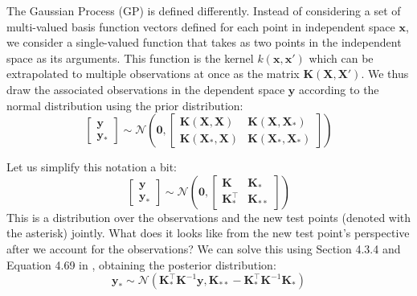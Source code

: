 \documentclass{article}
\begin{document}
The Gaussian Process (GP) is defined differently. Instead of considering a set of multi-valued basis function vectors defined for each point in independent space $\mathbf{x}$, we consider a single-valued function that takes as two points in the independent space as its arguments. This function is the kernel $k(\mathbf{x},\mathbf{x}')$ which can be extrapolated to multiple observations at once as the matrix $\mathbf{K}(\mathbf{X},\mathbf{X}')$. We thus draw the associated observations in the dependent space $\mathbf{y}$ according to the normal distribution using the prior distribution:
\begin{equation}
    \begin{bmatrix}
    \mathbf{y} \\
    \mathbf{y_\ast}
    \end{bmatrix} \sim
    \mathcal{N}\left(\mathbf{0},
    \begin{bmatrix}
    \mathbf{K}(\mathbf{X},\mathbf{X}) & \mathbf{K}(\mathbf{X},\mathbf{X}_\ast) \\
    \mathbf{K}(\mathbf{X}_\ast,\mathbf{X}) & \mathbf{K}(\mathbf{X}_\ast,\mathbf{X}_\ast)
    \end{bmatrix}\right)
\end{equation} 

Let us simplify this notation a bit:
\begin{equation}
    \begin{bmatrix}
    \mathbf{y} \\
    \mathbf{y_\ast}
    \end{bmatrix} \sim
    \mathcal{N}\left(\mathbf{0},
    \begin{bmatrix}
    \mathbf{K} & \mathbf{K}_\ast \\
    \mathbf{K}^\top_\ast & \mathbf{K}_{\ast\ast}
    \end{bmatrix}\right)
\end{equation} 
This is a distribution over the observations and the new test points (denoted with the asterisk) jointly. What does it looks like from the new test point's perspective after we account for the observations?  We can solve this using Section 4.3.4 and Equation 4.69 in \cite{murphy}, obtaining the posterior distribution:
\begin{equation}
\label{GP_posterior}
\mathbf{y}_\ast\sim\mathcal{N}\left(\mathbf{K}_\ast^\top \mathbf{K}^{-1}\mathbf{y},\mathbf{K}_{\ast\ast}-\mathbf{K}_\ast^\top \mathbf{K}^{-1}\mathbf{K}_\ast \right)
\end{equation}
\end{document}
